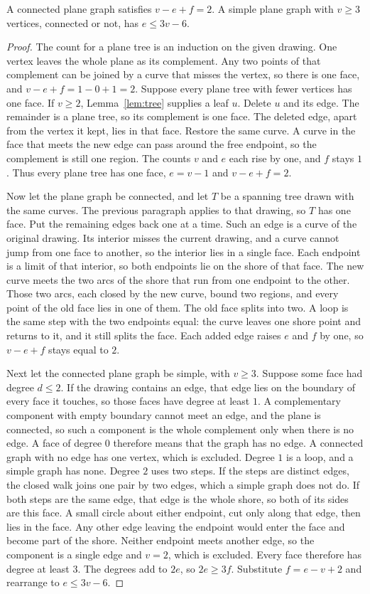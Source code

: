 \begin{proposition}[Euler]\label{prop:euler}
A connected plane graph satisfies $v-e+f=2$. A simple plane graph with $v\ge3$ vertices, connected or not, has $e\le 3v-6$.
\end{proposition}
\begin{proof}
The count for a plane tree is an induction on the given drawing. One vertex leaves the whole plane as its complement. Any two points of that complement can be joined by a curve that misses the vertex, so there is one face, and $v-e+f=1-0+1=2$. Suppose every plane tree with fewer vertices has one face. If $v\ge2$, Lemma~\ref{lem:tree} supplies a leaf $u$. Delete $u$ and its edge. The remainder is a plane tree, so its complement is one face. The deleted edge, apart from the vertex it kept, lies in that face. Restore the same curve. A curve in the face that meets the new edge can pass around the free endpoint, so the complement is still one region. The counts $v$ and $e$ each rise by one, and $f$ stays $1$. Thus every plane tree has one face, $e=v-1$ and $v-e+f=2$.

Now let the plane graph be connected, and let $T$ be a spanning tree drawn with the same curves. The previous paragraph applies to that drawing, so $T$ has one face. Put the remaining edges back one at a time. Such an edge is a curve of the original drawing. Its interior misses the current drawing, and a curve cannot jump from one face to another, so the interior lies in a single face. Each endpoint is a limit of that interior, so both endpoints lie on the shore of that face. The new curve meets the two arcs of the shore that run from one endpoint to the other. Those two arcs, each closed by the new curve, bound two regions, and every point of the old face lies in one of them. The old face splits into two. A loop is the same step with the two endpoints equal: the curve leaves one shore point and returns to it, and it still splits the face. Each added edge raises $e$ and $f$ by one, so $v-e+f$ stays equal to $2$.

Next let the connected plane graph be simple, with $v\ge3$. Suppose some face had degree $d\le2$. If the drawing contains an edge, that edge lies on the boundary of every face it touches, so those faces have degree at least $1$. A complementary component with empty boundary cannot meet an edge, and the plane is connected, so such a component is the whole complement only when there is no edge. A face of degree $0$ therefore means that the graph has no edge. A connected graph with no edge has one vertex, which is excluded. Degree $1$ is a loop, and a simple graph has none. Degree $2$ uses two steps. If the steps are distinct edges, the closed walk joins one pair by two edges, which a simple graph does not do. If both steps are the same edge, that edge is the whole shore, so both of its sides are this face. A small circle about either endpoint, cut only along that edge, then lies in the face. Any other edge leaving the endpoint would enter the face and become part of the shore. Neither endpoint meets another edge, so the component is a single edge and $v=2$, which is excluded. Every face therefore has degree at least $3$. The degrees add to $2e$, so $2e\ge3f$. Substitute $f=e-v+2$ and rearrange to $e\le3v-6$.


\end{proof}
